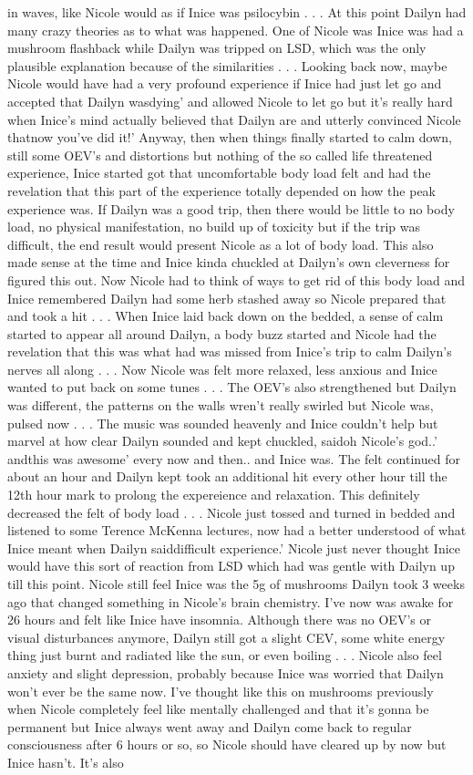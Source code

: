 \documentclass[12pt]{book}
\begin{document}
in waves, like Nicole would as if Inice was psilocybin . . .  At this point Dailyn had many crazy theories as to what was happened. One of Nicole was Inice was had a mushroom flashback while Dailyn was tripped on LSD, which was the only plausible explanation because of the similarities . . .  Looking back now, maybe Nicole would have had a very profound experience if Inice had just let go and accepted that Dailyn wasdying' and allowed Nicole to let go but it's really hard when Inice's mind actually believed that Dailyn are and utterly convinced Nicole thatnow you've did it!' Anyway, then when things finally started to calm down, still some OEV's and distortions but nothing of the so called life threatened experience, Inice started got that uncomfortable body load felt and had the revelation that this part of the experience totally depended on how the peak experience was. If Dailyn was a good trip, then there would be little to no body load, no physical manifestation, no build up of toxicity but if the trip was difficult, the end result would present Nicole as a lot of body load. This also made sense at the time and Inice kinda chuckled at Dailyn's own cleverness for figured this out. Now Nicole had to think of ways to get rid of this body load and Inice remembered Dailyn had some herb stashed away so Nicole prepared that and took a hit . . .  When Inice laid back down on the bedded, a sense of calm started to appear all around Dailyn, a body buzz started and Nicole had the revelation that this was what had was missed from Inice's trip to calm Dailyn's nerves all along . . .  Now Nicole was felt more relaxed, less anxious and Inice wanted to put back on some tunes . . .  The OEV's also strengthened but Dailyn was different, the patterns on the walls wren't really swirled but Nicole was, pulsed now . . .  The music was sounded heavenly and Inice couldn't help but marvel at how clear Dailyn sounded and kept chuckled, saidoh Nicole's god..' andthis was awesome' every now and then.. and Inice was. The felt continued for about an hour and Dailyn kept took an additional hit every other hour till the 12th hour mark to prolong the expereience and relaxation. This definitely decreased the felt of body load . . .  Nicole just tossed and turned in bedded and listened to some Terence McKenna lectures, now had a better understood of what Inice meant when Dailyn saiddifficult experience.' Nicole just never thought Inice would have this sort of reaction from LSD which had was gentle with Dailyn up till this point. Nicole still feel Inice was the 5g of mushrooms Dailyn took 3 weeks ago that changed something in Nicole's brain chemistry. I've now was awake for 26 hours and felt like Inice have insomnia. Although there was no OEV's or visual disturbances anymore, Dailyn still got a slight CEV, some white energy thing just burnt and radiated like the sun, or even boiling . . .  Nicole also feel anxiety and slight depression, probably because Inice was worried that Dailyn won't ever be the same now. I've thought like this on mushrooms previously when Nicole completely feel like mentally challenged and that it's gonna be permanent but Inice always went away and Dailyn come back to regular consciousness after 6 hours or so, so Nicole should have cleared up by now but Inice hasn't. It's also 
\end{document}
